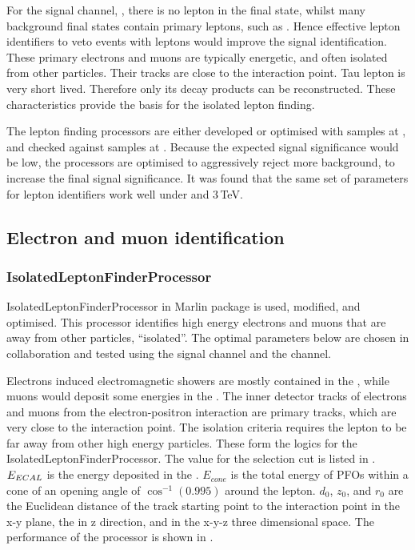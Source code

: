 For the signal channel, \eeToHHbbWWHad, there is no lepton in the final state, whilst many background final states contain primary leptons, such as \HepProcess{\Pquark \Pquark \Pquark \Pquark \Plepton \Pnu}. Hence effective lepton identifiers to veto events with leptons would improve the signal identification. These primary electrons and muons are typically energetic, and often isolated from other particles. Their tracks are close to the interaction point. Tau lepton is very short lived. Therefore only its decay products can be reconstructed. These characteristics provide the basis for the isolated lepton finding.


The lepton finding processors are either developed or optimised with samples at , and checked against samples at . Because the expected signal significance would be low, the processors are optimised to aggressively reject more background, to increase the final signal significance. It was found that the same set of parameters for lepton identifiers work well under  and 3\,TeV.

\subsection{Electron and muon identification}
\label{sec:doubleHiggsLeptonID}


\subsubsection{IsolatedLeptonFinderProcessor}
\label{sec:doubleHiggsIsolatedLeptonFinder}
IsolatedLeptonFinderProcessor in Marlin package is used, modified, and optimised. This processor identifies high energy electrons and muons that are away from other particles, ``isolated''. The optimal parameters below are chosen in collaboration and tested using the signal channel and the \eeTo{ \Pquark \Pquark \Pquark \Pquark \Plepton \Pnu} channel.

Electrons induced electromagnetic showers are mostly contained in the \ECAL, while muons would deposit some energies in the \ECAL. The inner detector tracks of electrons and muons from the electron-positron interaction are primary tracks, which are very close to the interaction point. The isolation criteria requires the lepton to be far away from other high energy particles. These form the logics for the IsolatedLeptonFinderProcessor. The value for the selection cut is listed in . $E_{ECAL}$ is the energy deposited in the \ECAL. $E_{cone}$ is the total energy of PFOs within a cone of an opening angle of $\cos^{-1}(0.995)$ around the lepton. $d_0$, $z_0$, and $r_0$ are the Euclidean distance of the track starting point to the interaction point in the x-y plane, the in z direction, and in the x-y-z three dimensional space. The performance of the processor is shown in .



